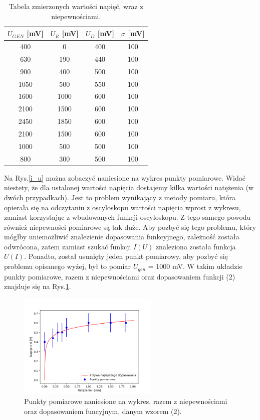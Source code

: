 \documentclass[10pt,a4paper]{article}
\begin{document}
\begin{table}[htp!]
\begin{center}
\begin{tabular}{|c|c|c|c|}
\hline 
$U_{GEN}$ [mV] & $U_R$ [mV] & $U_D$ [mV] & $\sigma$ [mV] \\ 
\hline
\hline
400 & 0 & 400 & 100 \\ 
\hline 
630 & 190 & 440 & 100 \\ 
\hline 
900 & 400 & 500 & 100 \\ 
\hline 
1050 & 500 & 550 & 100 \\ 
\hline 
1600 & 1000 & 600 & 100 \\ 
\hline 
2100 & 1500 & 600 & 100 \\ 
\hline 
2450 & 1850 & 600 & 100 \\ 
\hline 
2100 & 1500 & 600 & 100 \\ 
\hline 
1000 & 500 & 500 & 100 \\ 
\hline 
800 & 300 & 500 & 100 \\ 
\hline 
\end{tabular} 
\end{center}
\caption{Tabela zmierzonych wartości napięć, wraz z niepewnościami.} 
\label{tab1}
\end{table}
Na Rys.\ref{i_u} można zobaczyć naniesione na wykres punkty pomiarowe. Widać niestety, że dla ustalonej wartości napięcia dostajemy kilka wartości natężenia (w dwóch przypadkach). Jest to problem wynikający z metody pomiaru, która opierała się na odczytaniu z oscyloskopu wartości napięcia wprost z wykresu, zamiast korzystając z wbudowanych funkcji oscyloskopu. Z tego samego powodu również niepewności pomiarowe są tak duże. Aby pozbyć się tego problemu, który mógłby uniemożliwić znalezienie dopasowania funkcyjnego, zależność została odwrócona, zatem zamiast szukać funkcji $I(U)$ znaleziona została funkcja $U(I)$. Ponadto, został usunięty jeden punkt pomiarowy, aby pozbyć się problemu opisanego wyżej, był to pomiar $U_{gen}$ = 1000 mV. W takim układzie punkty pomiarowe, razem z niepewnościami oraz dopasowaniem funkcji (2) znajduje się na Rys.\ref{u_i}.
\begin{figure}[ht!]	
	\begin{center}
		\includegraphics[width = 0.6\textwidth]{u_i.png}
		\caption{Punkty pomiarowe naniesione na wykres, razem z niepewnościami oraz dopasowaniem funcyjnym, danym wzorem (2).}
		\label{u_i}
	\end{center}
\end{figure}	
\end{document}
